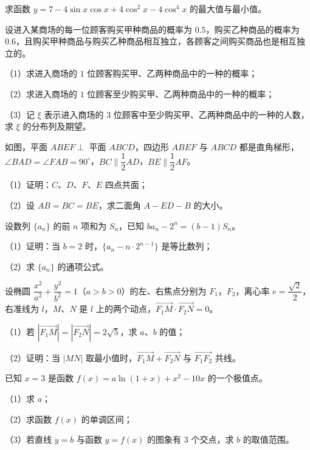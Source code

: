 \begin{question}
求函数 $y=7-4\sin x\cos x+4\cos^2x-4\cos^4x$ 的最大值与最小值。

\end{question}
\begin{question}
设进入某商场的每一位顾客购买甲种商品的概率为 $0.5$，购买乙种商品的概率为 $0.6$，且购买甲种商品与购买乙种商品相互独立，各顾客之间购买商品也是相互独立的。

（1）求进入商场的 $1$ 位顾客购买甲、乙两种商品中的一种的概率；

（2）求进入商场的 $1$ 位顾客至少购买甲、乙两种商品中的一种的概率；

（3）记 $\xi$ 表示进入商场的 $3$ 位顾客中至少购买甲、乙两种商品中的一种的人数，求 $\xi$ 的分布列及期望。

\Needspace{0.4\textheight}
\end{question}
\begin{question}
如图，平面 $ABEF\perp$ 平面 $ABCD$，四边形 $ABEF$ 与 $ABCD$ 都是直角梯形，$\angle BAD=\angle FAB=90^\circ$，$BC\parallel\dfrac12AD$，$BE\parallel\dfrac12AF$。

（1）证明：$C$、$D$、$F$、$E$ 四点共面；

（2）设 $AB=BC=BE$，求二面角 $A-ED-B$ 的大小。
\nopagebreak[4]
\begin{center}\end{center}
\nopagebreak[4]
\end{question}
\begin{question}
设数列 $\{a_n\}$ 的前 $n$ 项和为 $S_n$，已知 $ba_n-2^n=(b-1)S_n$。

（1）证明：当 $b=2$ 时，$\{a_n-n\cdot2^{n-1}\}$ 是等比数列；

（2）求 $\{a_n\}$ 的通项公式。

\Needspace{0.4\textheight}
\end{question}
\begin{question}
设椭圆 $\dfrac{x^2}{a^2}+\dfrac{y^2}{b^2}=1$（$a>b>0$）的左、右焦点分别为 $F_1$，$F_2$，离心率 $e=\dfrac{\sqrt2}2$，右准线为 $l$，$M$、$N$ 是 $l$ 上的两个动点，$\overrightarrow{F_1M}\cdot\overrightarrow{F_2N}=0$。

（1）若 $\left|\overrightarrow{F_1M}\right|=\left|\overrightarrow{F_2N}\right|=2\sqrt5$，求 $a$、$b$ 的值；

（2）证明：当 $|MN|$ 取最小值时，$\overrightarrow{F_1M}+\overrightarrow{F_2N}$ 与 $\overrightarrow{F_1F_2}$ 共线。
\nopagebreak[4]
\begin{center}\end{center}
\nopagebreak[4]
\end{question}
\begin{question}
已知 $x=3$ 是函数 $f(x)=a\ln(1+x)+x^2-10x$ 的一个极值点。

（1）求 $a$；

（2）求函数 $f(x)$ 的单调区间；

（3）若直线 $y=b$ 与函数 $y=f(x)$ 的图象有 $3$ 个交点，求 $b$ 的取值范围。

\end{question}